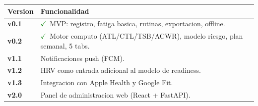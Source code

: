 \documentclass[12pt, a4paper]{article}
\begin{document}
\begin{longtable}{>{\bfseries}p{2.2cm} p{11.8cm}}
  \toprule
  Version & Funcionalidad \\
  \midrule
  \endhead
  v0.1 & \textcolor{green}{$\checkmark$}\ MVP: registro, fatiga basica, rutinas, exportacion, offline. \\
  v0.2 & \textcolor{green}{$\checkmark$}\ Motor computo (ATL/CTL/TSB/ACWR), modelo riesgo, plan semanal, 5 tabs. \\
  v1.1 & Notificaciones push (FCM). \\
  v1.2 & HRV como entrada adicional al modelo de readiness. \\
  v1.3 & Integracion con Apple Health y Google Fit. \\
  v2.0 & Panel de administracion web (React + FastAPI). \\
  \bottomrule
\end{longtable}
\end{document}

